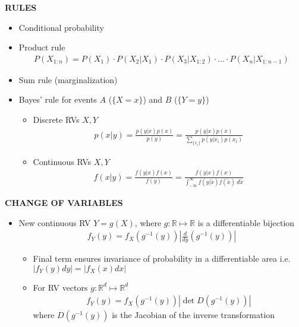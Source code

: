 \begin{whitebox}{\textbf{RULES}}
    \begin{itemize}
        \item Conditional probability
      \item Product rule
      \begin{align*}
          P(X_{1:n})=P(X_1)\cdot P(X_2| X_1)\cdot P(X_3| X_{1:2})\cdot\hdots\cdot P(X_n| X_{1:n-1})
      \end{align*}
       \item Sum rule (marginalization)
        \item Bayes' rule for events $A$ ($\{X=x\}$) and $B$ ($\{Y=y\}$)
        \begin{itemize}
            \item Discrete RVs $X,Y$
            \begin{align*}
                p(x|y)=\frac{p(y|x)p(x)}{p(y)}=\frac{p(y|x)p(x)}{\sum_{\{x_i\}}p(y|x_i)p(x_i)}
            \end{align*}
            \item Continuous RVs $X,Y$
            \begin{align*}
                f(x|y)=\frac{f(y|x)f(x)}{f(y)}=\frac{f(y|x)f(x)}{\int_{-\infty}^\infty f(y|\tilde{x})f(\tilde{x})\ d\tilde{x}}
            \end{align*}
        \end{itemize}
    \end{itemize}
\end{whitebox}

\begin{whitebox}{\textbf{CHANGE OF VARIABLES}}
    \begin{itemize}
        \item New continuous RV $Y=g(X)$, where $g:\mathbb{R}\mapsto\mathbb{R}$ is a differentiable bijection
        \begin{align*}
            f_Y(y)=f_X(g^{-1}(y))\left|\frac{d}{dy}(g^{-1}(y))\right|
        \end{align*}
        \begin{itemize}
            \item Final term ensures invariance of probability in a differentiable area i.e. $|f_Y(y)dy|=|f_X(x)dx|$
            \item For RV vectors $g:\mathbb{R}^d\mapsto\mathbb{R}^d$
            \begin{align*}
                f_Y(y)=f_X(g^{-1}(y))\left|\det D(g^{-1}(y))\right|
            \end{align*}
            where $D(g^{-1}(y))$ is the Jacobian of the inverse transformation
        \end{itemize}
    \end{itemize}
\end{whitebox}

